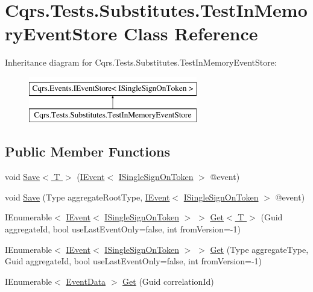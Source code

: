 \hypertarget{classCqrs_1_1Tests_1_1Substitutes_1_1TestInMemoryEventStore}{}\section{Cqrs.\+Tests.\+Substitutes.\+Test\+In\+Memory\+Event\+Store Class Reference}
\label{classCqrs_1_1Tests_1_1Substitutes_1_1TestInMemoryEventStore}
Inheritance diagram for Cqrs.\+Tests.\+Substitutes.\+Test\+In\+Memory\+Event\+Store\+:\begin{figure}[H]
\begin{center}
\leavevmode
\includegraphics[height=2.000000cm]{classCqrs_1_1Tests_1_1Substitutes_1_1TestInMemoryEventStore}
\end{center}
\end{figure}
\subsection*{Public Member Functions}
\begin{DoxyCompactItemize}
\item 
void \hyperlink{classCqrs_1_1Tests_1_1Substitutes_1_1TestInMemoryEventStore_ac5d70085f30ac4c8be0790bc14de90d3}{Save$<$ T $>$} (\hyperlink{interfaceCqrs_1_1Events_1_1IEvent}{I\+Event}$<$ \hyperlink{interfaceCqrs_1_1Authentication_1_1ISingleSignOnToken}{I\+Single\+Sign\+On\+Token} $>$ @event)
\item 
void \hyperlink{classCqrs_1_1Tests_1_1Substitutes_1_1TestInMemoryEventStore_ad55933a4b148cef3d59c5552038af878}{Save} (Type aggregate\+Root\+Type, \hyperlink{interfaceCqrs_1_1Events_1_1IEvent}{I\+Event}$<$ \hyperlink{interfaceCqrs_1_1Authentication_1_1ISingleSignOnToken}{I\+Single\+Sign\+On\+Token} $>$ @event)
\item 
I\+Enumerable$<$ \hyperlink{interfaceCqrs_1_1Events_1_1IEvent}{I\+Event}$<$ \hyperlink{interfaceCqrs_1_1Authentication_1_1ISingleSignOnToken}{I\+Single\+Sign\+On\+Token} $>$ $>$ \hyperlink{classCqrs_1_1Tests_1_1Substitutes_1_1TestInMemoryEventStore_a6fe1ca9d8bcd3f29401457340139af11}{Get$<$ T $>$} (Guid aggregate\+Id, bool use\+Last\+Event\+Only=false, int from\+Version=-\/1)
\item 
I\+Enumerable$<$ \hyperlink{interfaceCqrs_1_1Events_1_1IEvent}{I\+Event}$<$ \hyperlink{interfaceCqrs_1_1Authentication_1_1ISingleSignOnToken}{I\+Single\+Sign\+On\+Token} $>$ $>$ \hyperlink{classCqrs_1_1Tests_1_1Substitutes_1_1TestInMemoryEventStore_a45873558fbc3bc5eb1766ffc6fbead88}{Get} (Type aggregate\+Type, Guid aggregate\+Id, bool use\+Last\+Event\+Only=false, int from\+Version=-\/1)
\item 
I\+Enumerable$<$ \hyperlink{classCqrs_1_1Events_1_1EventData}{Event\+Data} $>$ \hyperlink{classCqrs_1_1Tests_1_1Substitutes_1_1TestInMemoryEventStore_a23098904b073af45d3a945f4a21d51e3}{Get} (Guid correlation\+Id)
\end{DoxyCompactItemize}
